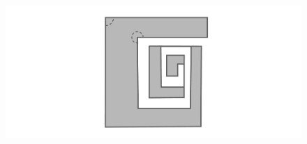 \documentclass{beamer}
\begin{document}
\begin{frame}
\begin{figure}[h]
\includegraphics[width=\textwidth]{Poligono-espiral}
\end{figure}
\end{frame}
\end{document}
